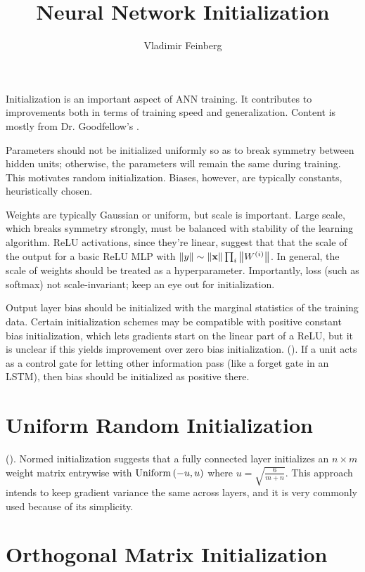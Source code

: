 \documentclass{article}
\title{Neural Network Initialization}
\author{Vladimir Feinberg}
\begin{document}
\maketitle

Initialization is an important aspect of ANN training. It contributes to improvements both in terms of training speed and generalization. Content is mostly from Dr. Goodfellow's .

Parameters should not be initialized uniformly so as to break symmetry between hidden units; otherwise, the parameters will remain the same during training. This motivates random initialization. Biases, however, are typically constants, heuristically chosen.

Weights are typically Gaussian or uniform, but scale is important. Large scale, which breaks symmetry strongly, must be balanced with stability of the learning algorithm. ReLU activations, since they're linear, suggest that that the scale of the output for a basic ReLU MLP with $\left\| y \right\|\sim \left\| \textbf{x} \right\|\prod_i\left\| W^{(i)} \right\|$. In general, the scale of weights should be treated as a hyperparameter. Importantly, loss (such as softmax) not scale-invariant; keep an eye out for initialization.

Output layer bias should be initialized with the marginal statistics of the training data. Certain initialization schemes may be compatible with positive constant bias initialization, which lets gradients start on the linear part of a ReLU, but it is unclear if this yields improvement over zero bias initialization. (). If a unit acts as a control gate for letting other information pass (like a forget gate in an LSTM), then bias should be initialized as positive there.

\section{Uniform Random Initialization}

(). Normed initialization suggests that a fully connected layer initializes an $n\times m$ weight matrix entrywise with $\operatorname{Uniform}\left({-u, u}\right)$ where $u=\sqrt{\frac{6}{m+n}}$. This approach intends to keep gradient variance the same across layers, and it is very commonly used because of its simplicity.

\section{Orthogonal Matrix Initialization}
\end{document}
